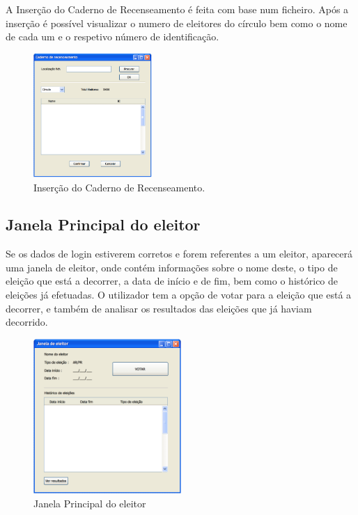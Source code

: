 \documentclass[a4paper,12pt]{report}
\begin{document}
A Inserção do Caderno de Recenseamento é feita com base num ficheiro. Após a inserção é possível visualizar o numero de eleitores do círculo bem como o nome de cada um e o respetivo número de identificação.
\begin{figure}[h]
\begin{center}
	\includegraphics[width=0.4\textwidth]{media/mockup/CR.png}
	 \caption{Inserção do Caderno de Recenseamento.}
\end{center}
\end{figure}

\newpage
\subsection{Janela Principal do eleitor}

Se os dados de login estiverem corretos e forem referentes a um eleitor, aparecerá uma janela de eleitor, onde contém informações sobre o nome deste, o tipo de eleição que está a decorrer, a data de início e de fim, bem como o histórico de eleições já efetuadas.
\indent O utilizador tem a opção de votar para a eleição que está a decorrer, e também de analisar os resultados das eleições que já haviam decorrido.

\begin{figure}[h]
\begin{center}
	\includegraphics[width=0.5\textwidth]{media/mockup/MainEleitor.png}
	 \caption{Janela Principal do eleitor}
\end{center}
\end{figure}
\end{document}
